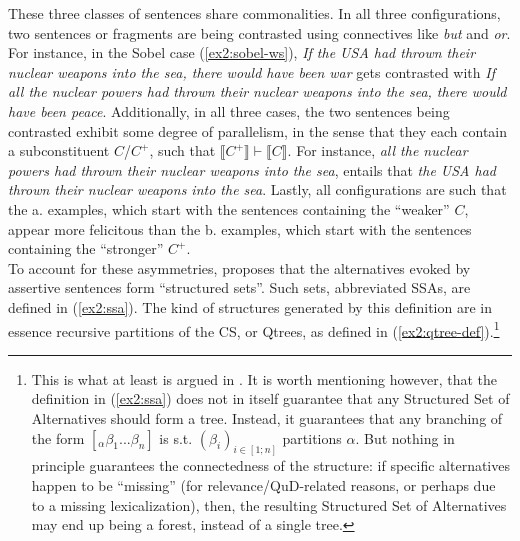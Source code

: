 These three classes of sentences share commonalities. In all three configurations, two sentences or fragments are being contrasted using connectives like \textit{but} and \textit{or}. For instance, in the Sobel case (\ref{ex2:sobel-ws}), \textit{If the USA had thrown their nuclear weapons into the sea, there would have been war} gets contrasted with \textit{If all the nuclear powers had thrown their nuclear weapons into the sea, there would have been peace}. Additionally, in all three cases, the two sentences being contrasted exhibit some degree of parallelism, in the sense that they each contain a subconstituent $C$/$C^+$, such that $\llbracket C^+ \rrbracket \vdash \llbracket C \rrbracket$. For instance, \textit{all the nuclear powers had thrown their nuclear weapons into the sea}, entails that \textit{the USA had thrown their nuclear weapons into the sea}. Lastly, all configurations are such that the a. examples, which start with the sentences containing the ``weaker'' $C$, appear more felicitous than the b. examples, which start with the sentences containing the ``stronger'' $C^+$. \\


To account for these asymmetries, \citet{Ippolito2019} proposes that the alternatives evoked by assertive sentences form ``structured sets''. Such sets, abbreviated SSAs, are defined in (\ref{ex2:ssa}). The kind of structures generated by this definition are in essence recursive partitions of the CS, or Qtrees, as defined in (\ref{ex2:qtree-def}).\footnote{This is what at least is argued in \citet{Ippolito2019}. It is worth mentioning however, that the definition in (\ref{ex2:ssa}) does not in itself guarantee that any Structured Set of Alternatives should form a tree. Instead, it guarantees that any branching of the form $[_{\alpha} \beta_1 ... \beta_n]$ is s.t. $(\beta_i)_{i\in [1; n]}$ partitions $\alpha$. But nothing in principle guarantees the connectedness of the structure: if specific alternatives happen to be ``missing'' (for relevance/QuD-related reasons, or perhaps due to a missing lexicalization), then, the resulting Structured Set of Alternatives may end up being a forest, instead of a single tree.}

